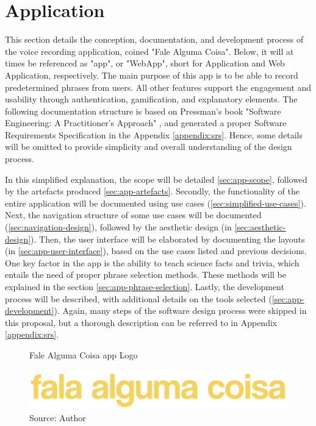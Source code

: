 \chapter{Application}
\label{chap:proposal-application}

This section details the conception, documentation, and development process of the voice recording application, coined "Fale Alguma Coisa". Below, it will at times be referenced as "app", or "WebApp", short for Application and Web Application, respectively. The main purpose of this app is to be able to record predetermined phrases from users. All other features support the engagement and usability through authentication, gamification, and explanatory elements. The following documentation structure is based on Pressman's book "Software Engineering: A Practitioner's Approach" \cite{pressman2014software}, and generated a proper Software Requirements Specification in the Appendix \ref{appendix:srs}. Hence, some details will be omitted to provide simplicity and overall understanding of the design process.

In this simplified explanation, the scope will be detailed \ref{sec:app-scope}, followed by the artefacts produced \ref{sec:app-artefacts}. Secondly, the functionality of the entire application will be documented using use cases (\ref{sec:simplified-use-cases}). Next, the navigation structure of some use cases will be documented (\ref{sec:navigation-design}), followed by the aesthetic design (in \ref{sec:aesthetic-design}). Then, the user interface will be elaborated by documenting the layouts (in \ref{sec:app-user-interface}), based on the use cases listed and previous decisions. One key factor in the app is the ability to teach science facts and trivia, which entails the need of proper phrase selection methods. These methods will be explained in the section \ref{sec:app-phrase-selection}. Lastly, the development process will be described, with additional details on the tools selected (\ref{sec:app-development}). Again, many steps of the software design process were skipped in this proposal, but a thorough description can be referred to in Appendix \ref{appendix:srs}.

\begin{figure}[ht]
    \centering
    \caption{Fale Alguma Coisa app Logo}
     \includegraphics[width=\linewidth/2]{images/app/logo.jpg}
    \caption*{Source: Author}
    \label{fig:falealgumacoisa-logo}
\end{figure}

